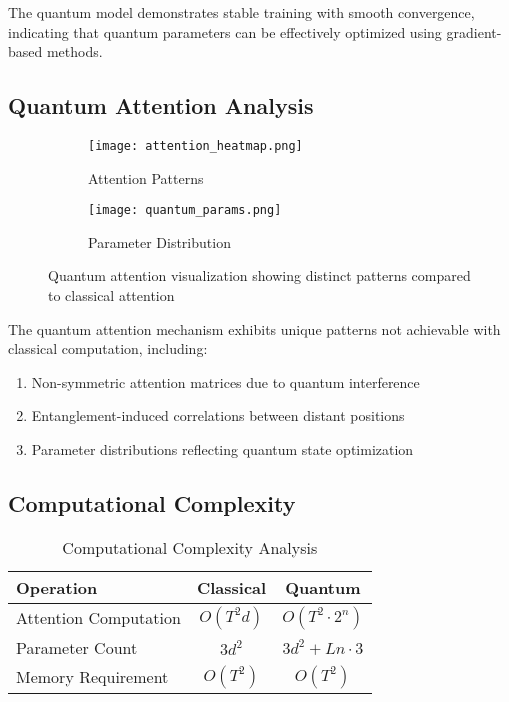 \documentclass[11pt,twocolumn]{article}
\begin{document}
The quantum model demonstrates stable training with smooth convergence, indicating that quantum parameters can be effectively optimized using gradient-based methods.

\subsection{Quantum Attention Analysis}

\begin{figure}[H]
\centering
\begin{subfigure}{0.23\textwidth}
    \texttt{[image: attention\_heatmap.png]}
    \caption{Attention Patterns}
\end{subfigure}
\begin{subfigure}{0.23\textwidth}
    \texttt{[image: quantum\_params.png]}
    \caption{Parameter Distribution}
\end{subfigure}
\caption{Quantum attention visualization showing distinct patterns compared to classical attention}
\end{figure}

The quantum attention mechanism exhibits unique patterns not achievable with classical computation, including:
\begin{enumerate}
    \item Non-symmetric attention matrices due to quantum interference
    \item Entanglement-induced correlations between distant positions
    \item Parameter distributions reflecting quantum state optimization
\end{enumerate}

\subsection{Computational Complexity}

\begin{table}[H]
\centering
\caption{Computational Complexity Analysis}
\begin{tabular}{@{}lcc@{}}
\toprule
Operation & Classical & Quantum \\
\midrule
Attention Computation & $O(T^2 d)$ & $O(T^2 \cdot 2^n)$ \\
Parameter Count & $3d^2$ & $3d^2 + Ln \cdot 3$ \\
Memory Requirement & $O(T^2)$ & $O(T^2)$ \\
\bottomrule
\end{tabular}
\end{table}
\end{document}

